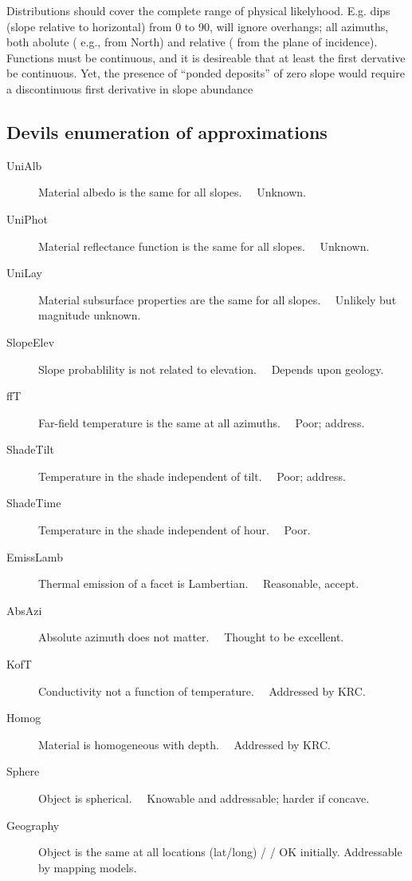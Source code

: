 \documentclass{article}
\begin{document}
Distributions should cover the complete range of physical likelyhood. E.g. dips
(slope relative to horizontal) from 0 to 90\qd, will ignore overhangs; all
azimuths, both abolute ( e.g., from North) and relative ( from the plane of
incidence). Functions must be continuous, and it is desireable that at least the
first dervative be continuous. Yet, the presence of ``ponded deposits'' of zero
slope would require a discontinuous first derivative in slope abundance


\subsection{Devils enumeration of approximations} %
\begin{description}    %
\item [UniAlb] Material albedo is the same for all slopes. \ \   Unknown.
\item [UniPhot] Material reflectance function is the same for all slopes. \ \   Unknown.
\item [UniLay] Material subsurface properties are the same for all slopes. \ \   Unlikely but magnitude unknown.   
\item [SlopeElev] Slope probablility is not related to elevation.  \ \ Depends upon geology.
\item [ffT] Far-field temperature is the same at all azimuths. \ \ Poor; address. 
\item [ShadeTilt] Temperature in the shade independent of tilt. \ \  Poor; address.
\item [ShadeTime] Temperature in the shade independent of hour.  \ \ Poor.
\item [EmissLamb] Thermal emission of a facet is Lambertian. \ \  Reasonable, accept. 
\item [AbsAzi] Absolute azimuth does not matter. \ \  Thought to be excellent.
\item [KofT] Conductivity not a function of temperature. \ \ Addressed by KRC.
\item [Homog] Material is homogeneous with depth.  \ \  Addressed by KRC.
\item [Sphere] Object is spherical. \ \ Knowable and addressable; harder if concave. 
\item [Geography] Object is the same at all locations (lat/long) / / OK initially. Addressable by mapping models. 

\end{description}
\end{document}
